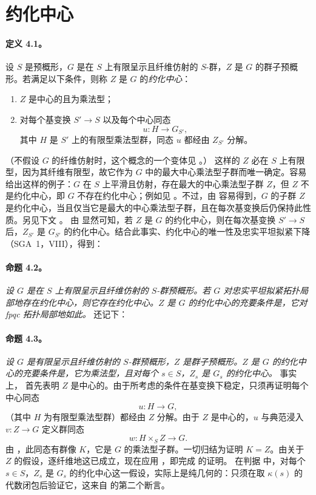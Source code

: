 
\section{约化中心}
\paragraph{\textbf{定义 4.1。}}
设 \(S\) 是预概形，\(G\) 是在 \(S\) 上有限呈示且纤维仿射的 \(S\)-群，\(Z\) 是 \(G\) 的群子预概形。若满足以下条件，则称 \(Z\) 是 \(G\) 的\emph{约化中心}：
\begin{enumerate}
\item[(i)] \(Z\) 是中心的且为乘法型；
\item[(ii)] 对每个基变换 \(S'\to S\) 以及每个中心同态
\[
  u:H\longrightarrow G_{S'},
\]
其中 \(H\) 是 \(S'\) 上的有限型乘法型群，同态 \(u\) 都经由 \(Z_{S'}\) 分解。
\end{enumerate}
（不假设 \(G\) 的纤维仿射时，这个概念的一个变体见 。）
这样的 \(Z\) 必在 \(S\) 上有限型，因为其纤维有限型，故它作为 \(G\) 中的最大中心乘法型子群而唯一确定。容易给出这样的例子：\(G\) 在 \(S\) 上平滑且仿射，存在最大的中心乘法型子群 \(Z\)，但 \(Z\) 不是约化中心，即 \(G\) 不存在约化中心；例如见 。不过，由  容易得到，\(G\) 的子群 \(Z\) 是约化中心，当且仅当它是最大的中心乘法型子群，且在每次基变换后仍保持此性质。另见下文 。
由  显然可知，若 \(Z\) 是 \(G\) 的约化中心，则在每次基变换 \(S'\to S\) 后，\(Z_{S'}\) 是 \(G_{S'}\) 的约化中心。结合此事实、约化中心的唯一性及忠实平坦拟紧下降（SGA~1，VIII），得到：
\paragraph{\textbf{命题 4.2。}}
\emph{设 \(G\) 是在 \(S\) 上有限呈示且纤维仿射的 \(S\)-群预概形。若 \(G\) 对忠实平坦拟紧拓扑局部地存在约化中心，则它存在约化中心。\(Z\) 是 \(G\) 的约化中心的充要条件是，它对 fpqc 拓扑局部地如此。}
还记下：
\paragraph{\textbf{命题 4.3。}}
\emph{设 \(G\) 是有限呈示且纤维仿射的 \(S\)-群预概形，\(Z\) 是群子预概形。\(Z\) 是 \(G\) 的约化中心的充要条件是，它为乘法型，且对每个 \(s\in S\)，\(Z_s\) 是 \(G_s\) 的约化中心。}
事实上， 首先表明 \(Z\) 是中心的。由于所考虑的条件在基变换下稳定，只须再证明每个中心同态
\[
  u:H\longrightarrow G,
\]
（其中 \(H\) 为有限型乘法型群）都经由 \(Z\) 分解。由于 \(Z\) 是中心的，\(u\) 与典范浸入 \(v:Z\to G\) 定义群同态
\[
  w:H\times_S Z\longrightarrow G.
\]
由 ，此同态有群像 \(K\)，它是 \(G\) 的乘法型子群。一切归结为证明 \(K=Z\)。由关于 \(Z\) 的假设，逐纤维地这已成立，现在应用 ，即完成  的证明。
在判据  中，对每个 \(s\in S\)，\(Z_s\) 是 \(G_s\) 的约化中心这一假设，实际上是纯几何的：只须在取 \(\kappa(s)\) 的代数闭包后验证它，这来自  的第二个断言。
